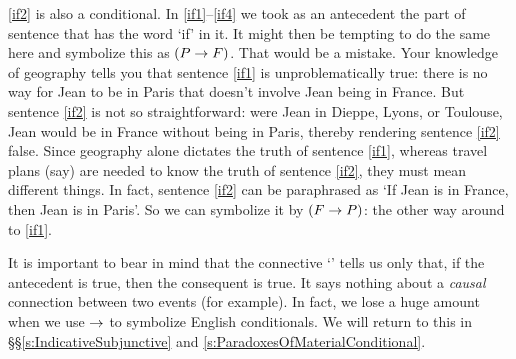 \ref{if2} is also a conditional. In \ref{if1}--\ref{if4} we took as an antecedent the part of sentence that has the word `if' in it. It might then be tempting to do the same here and symbolize this as $(P\rightarrow F)$. That would be a mistake. Your knowledge of geography tells you that sentence \ref{if1} is unproblematically true: there is no way for Jean to be in Paris that doesn't involve Jean being in France. But sentence \ref{if2} is not so straightforward: were  Jean in Dieppe, Lyons, or Toulouse, Jean would be in France without being in Paris, thereby rendering sentence \ref{if2} false. Since geography alone dictates the truth of sentence \ref{if1}, whereas travel plans (say) are needed to know the truth of sentence \ref{if2}, they must mean different things.
In fact, sentence \ref{if2} can be paraphrased as `If Jean is in France, then Jean is in Paris'. So we can symbolize it by $(F \rightarrow P)$: the other way around to \ref{if1}.

\noindent It is important to bear in mind that the connective `\eif' tells us only that, if the antecedent is true, then the consequent is true. It says nothing about a \emph{causal} connection between two events (for example). In fact, we lose a huge amount when we use $\rightarrow$ to symbolize English conditionals. We will return to this in \S\S\ref{s:IndicativeSubjunctive} and \ref{s:ParadoxesOfMaterialConditional}.

%


